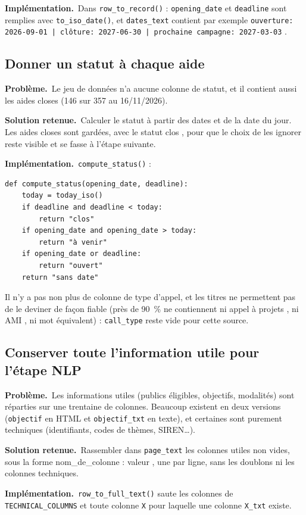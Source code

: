 \documentclass[11pt,a4paper]{article}
\newcommand{\pb}{\par\medskip\noindent\textbf{\textcolor{pbcolor}{Problème.}}\ }
\newcommand{\sol}{\par\medskip\noindent\textbf{\textcolor{solcolor}{Solution retenue.}}\ }
\newcommand{\impl}{\par\medskip\noindent\textbf{\textcolor{implcolor}{Implémentation.}}\ }
\newcommand{\code}[1]{\texttt{#1}}
\begin{document}
\impl Dans \code{row\_to\_record()} : \code{opening\_date} et \code{deadline} sont remplies
avec \code{to\_iso\_date()}, et \code{dates\_text} contient par exemple
\og \code{ouverture: 2026-09-01 | clôture: 2027-06-30 | prochaine campagne: 2027-03-03} \fg.

\subsection{Donner un statut à chaque aide}

\pb Le jeu de données n'a aucune colonne de statut, et il contient aussi les aides closes
(146 sur 357 au 16/11/2026).

\sol Calculer le statut à partir des dates et de la date du jour. Les aides closes sont
gardées, avec le statut \og clos \fg, pour que le choix de les ignorer reste visible et se
fasse à l'étape suivante.

\impl \code{compute\_status()} :

\begin{lstlisting}
def compute_status(opening_date, deadline):
    today = today_iso()
    if deadline and deadline < today:
        return "clos"
    if opening_date and opening_date > today:
        return "à venir"
    if opening_date or deadline:
        return "ouvert"
    return "sans date"
\end{lstlisting}

Il n'y a pas non plus de colonne de type d'appel, et les titres ne permettent pas de le
deviner de façon fiable (près de 90~\% ne contiennent ni \og appel à projets \fg, ni
\og AMI \fg, ni mot équivalent) : \code{call\_type} reste vide pour cette source.

\subsection{Conserver toute l'information utile pour l'étape NLP}

\pb Les informations utiles (publics éligibles, objectifs, modalités) sont réparties sur
une trentaine de colonnes. Beaucoup existent en deux versions (\code{objectif} en HTML et
\code{objectif\_txt} en texte), et certaines sont purement techniques (identifiants,
codes de thèmes, SIREN\dots).

\sol Rassembler dans \code{page\_text} les colonnes utiles non vides, sous la forme
\og nom\_de\_colonne : valeur \fg, une par ligne, sans les doublons ni les colonnes
techniques.

\impl \code{row\_to\_full\_text()} saute les colonnes de \code{TECHNICAL\_COLUMNS} et toute
colonne \code{X} pour laquelle une colonne \code{X\_txt} existe.
\end{document}

